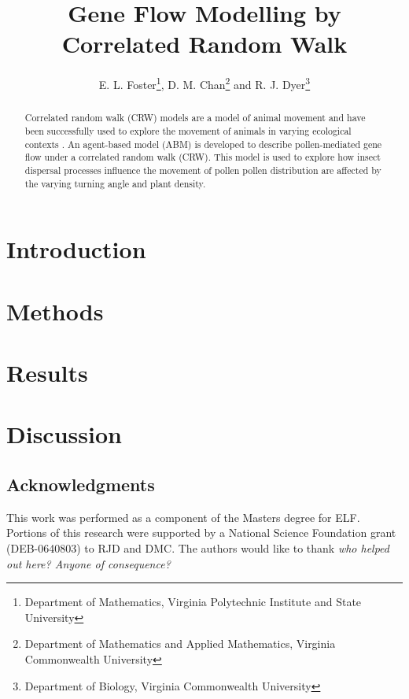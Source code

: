 \documentclass{article}
\title{Gene Flow Modelling by Correlated Random Walk}
\author{E. L. Foster\thanks{Department of Mathematics, Virginia Polytechnic Institute and State
University}, D. M. Chan\thanks{Department of Mathematics and Applied Mathematics, Virginia
Commonwealth University} and R. J. Dyer\thanks{Department of Biology, Virginia Commonwealth
University}}
\begin{document}
\maketitle

\begin{abstract} 
  Correlated random walk (CRW) models are a model of animal movement \cite{Prasad05} and have been
  successfully used to explore the movement of animals in varying ecological contexts
  \cite{Bartumeus07}. An agent-based model (ABM) is developed to describe pollen-mediated gene flow under 
  a correlated random walk (CRW). This model is used to explore how insect dispersal processes influence
  the movement of pollen  pollen
  distribution are affected by the varying turning angle and plant density.  
\end{abstract}

\section{Introduction}
  
\section{Methods}
  
\section{Results}
  
\section{Discussion}
  
\subsection*{Acknowledgments}
This work was performed as a component of the Masters degree for ELF.  Portions of this research were supported by a National Science Foundation grant (DEB-0640803) to RJD and DMC.  The authors would like to thank \emph{who helped out here?  Anyone of consequence?}


\end{document}
